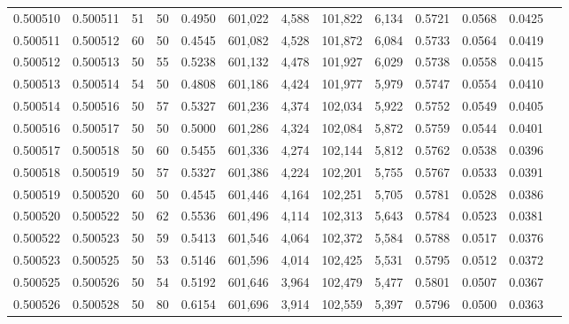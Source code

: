 \begin{tabular}{rrrrrrrrrrrrr}
0.500510 & 0.500511 &    51 &  50 &                                     0.4950 & 601,022 &   4,588 & 101,822 &   6,134 & 0.5721 & 0.0568 & 0.0425 \\
0.500511 & 0.500512 &    60 &  50 &                                     0.4545 & 601,082 &   4,528 & 101,872 &   6,084 & 0.5733 & 0.0564 & 0.0419 \\
0.500512 & 0.500513 &    50 &  55 &                                     0.5238 & 601,132 &   4,478 & 101,927 &   6,029 & 0.5738 & 0.0558 & 0.0415 \\
0.500513 & 0.500514 &    54 &  50 &                                     0.4808 & 601,186 &   4,424 & 101,977 &   5,979 & 0.5747 & 0.0554 & 0.0410 \\
0.500514 & 0.500516 &    50 &  57 &                                     0.5327 & 601,236 &   4,374 & 102,034 &   5,922 & 0.5752 & 0.0549 & 0.0405 \\
0.500516 & 0.500517 &    50 &  50 &                                     0.5000 & 601,286 &   4,324 & 102,084 &   5,872 & 0.5759 & 0.0544 & 0.0401 \\
0.500517 & 0.500518 &    50 &  60 &                                     0.5455 & 601,336 &   4,274 & 102,144 &   5,812 & 0.5762 & 0.0538 & 0.0396 \\
0.500518 & 0.500519 &    50 &  57 &                                     0.5327 & 601,386 &   4,224 & 102,201 &   5,755 & 0.5767 & 0.0533 & 0.0391 \\
0.500519 & 0.500520 &    60 &  50 &                                     0.4545 & 601,446 &   4,164 & 102,251 &   5,705 & 0.5781 & 0.0528 & 0.0386 \\
0.500520 & 0.500522 &    50 &  62 &                                     0.5536 & 601,496 &   4,114 & 102,313 &   5,643 & 0.5784 & 0.0523 & 0.0381 \\
0.500522 & 0.500523 &    50 &  59 &                                     0.5413 & 601,546 &   4,064 & 102,372 &   5,584 & 0.5788 & 0.0517 & 0.0376 \\
0.500523 & 0.500525 &    50 &  53 &                                     0.5146 & 601,596 &   4,014 & 102,425 &   5,531 & 0.5795 & 0.0512 & 0.0372 \\
0.500525 & 0.500526 &    50 &  54 &                                     0.5192 & 601,646 &   3,964 & 102,479 &   5,477 & 0.5801 & 0.0507 & 0.0367 \\
0.500526 & 0.500528 &    50 &  80 &                                     0.6154 & 601,696 &   3,914 & 102,559 &   5,397 & 0.5796 & 0.0500 & 0.0363 \\

\end{tabular}

